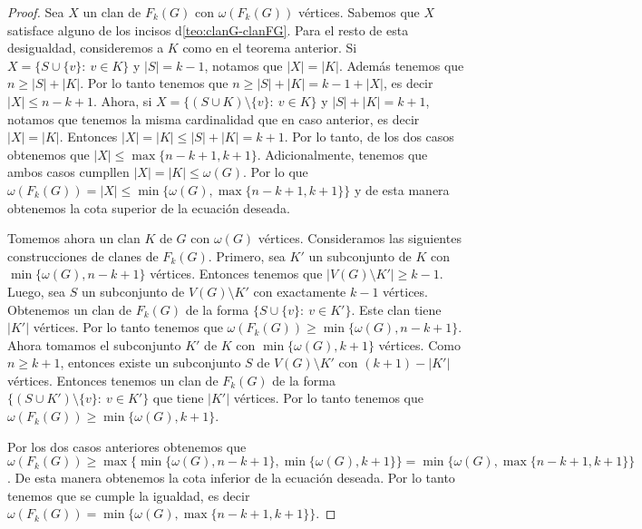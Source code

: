     \begin{proof}
        Sea $X$ un clan de $F_k(G)$ con $\omega(F_k(G))$ v\'ertices. Sabemos que
        $X$ satisface alguno de los incisos d\cref{teo:clanG-clanFG}. Para el resto de esta desigualdad, consideremos a $K$ como en el
        teorema anterior.   Si $X = \{S \cup \{v\} \colon\ v \in K\}$ y $|S| =
        k-1$, notamos que $|X| = |K|$. Adem\'as tenemos que $n \geq |S| + |K|$.
        Por lo tanto tenemos que $n \geq |S| + |K| = k-1 + |X|$, es decir $|X|
        \leq n-k+1$. Ahora, si $X = \{(S\cup K) \setminus \{v\} \colon\ v \in K
        \}$ y $|S| + |K| = k+1$, notamos que tenemos la misma cardinalidad que
        en caso anterior, es decir $|X| =|K|$. Entonces $|X| = |K| \leq |S| +
        |K| = k+1$. Por lo tanto, de los dos casos obtenemos que $|X| \leq
        \max\{n-k+1, k+1\}$. Adicionalmente, tenemos que ambos casos cumpllen
        $|X| = |K| \leq \omega(G)$. Por lo que $\omega(F_k(G)) = |X| \leq \min
        \{\omega(G), \max \{n-k+1, k+1\}\}$ y de esta manera obtenemos la cota
        superior de la ecuaci\'on deseada.

        Tomemos ahora un clan $K$ de $G$ con $\omega(G)$ v\'ertices.
        Consideramos las siguientes construcciones de clanes de $F_k(G)$.
        Primero, sea $K'$ un subconjunto de $K$ con $\min\{\omega(G),n-k+1\}$
        v\'ertices. Entonces tenemos que $|V(G) \setminus K'| \geq k-1$. Luego,
        sea $S$ un subconjunto de $V(G) \setminus K'$ con exactamente $k-1$
        v\'ertices. Obtenemos un clan de $F_k(G)$ de la forma $\{ S \cup \{v\}
        \colon\ v \in K'\}$. Este clan tiene $|K'|$ v\'ertices. Por lo tanto
        tenemos que $\omega(F_k(G)) \geq \min \{\omega(G), n-k+1\}$. Ahora
        tomamos el subconjunto $K'$ de $K$ con $\min \{ \omega(G), k+1\}$
        v\'ertices. Como $n \geq k+1$, entonces existe un subconjunto $S$ de
        $V(G) \setminus K'$ con $(k+1)-|K'|$ v\'ertices. Entonces tenemos un
        clan de $F_k(G)$ de la forma $\{ (S \cup K') \setminus \{v\} \colon\ v
        \in K'\}$ que tiene $|K'|$ v\'ertices. Por lo tanto tenemos que
        $\omega(F_k(G)) \geq \min \{\omega(G), k+1\}$.

        Por los dos casos anteriores obtenemos que $\omega(F_k(G)) \geq \max
        \{\min \{\omega(G), n-k+1\}, \min \{\omega(G), k+1 \}\} = \min
        \{\omega(G), \max \{n-k+1,k+1\}\}$. De esta manera obtenemos la cota
        inferior de la ecuaci\'on deseada. Por lo tanto tenemos que se cumple la
        igualdad, es decir  $\omega(F_k(G))= \min \{\omega(G), \max
        \{n-k+1,k+1\}\}$.
    \end{proof}

